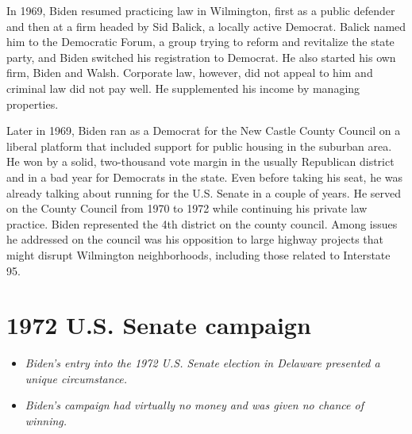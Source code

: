 In 1969, Biden resumed practicing law in Wilmington, first as a public
defender and then at a firm headed by Sid Balick, a locally active
Democrat. Balick named him to the Democratic Forum, a group trying to
reform and revitalize the state party, and Biden switched his
registration to Democrat. He also started his own firm, Biden and Walsh.
Corporate law, however, did not appeal to him and criminal law did not
pay well. He supplemented his income by managing properties.

Later in 1969, Biden ran as a Democrat for the New Castle County Council
on a liberal platform that included support for public housing in the
suburban area. He won by a solid, two-thousand vote margin in the
usually Republican district and in a bad year for Democrats in the
state. Even before taking his seat, he was already talking about running
for the U.S. Senate in a couple of years. He served on the County
Council from 1970 to 1972 while continuing his private law practice.
Biden represented the 4th district on the county council. Among issues
he addressed on the council was his opposition to large highway projects
that might disrupt Wilmington neighborhoods, including those related to
Interstate 95.

\section{1972 U.S. Senate campaign}\label{u.s.-senate-campaign}

\begin{itemize}
\item
  \emph{Biden's entry into the 1972 U.S. Senate election in Delaware
  presented a unique circumstance.}
\item
  \emph{Biden's campaign had virtually no money and was given no chance
  of winning.}
\end{itemize}

